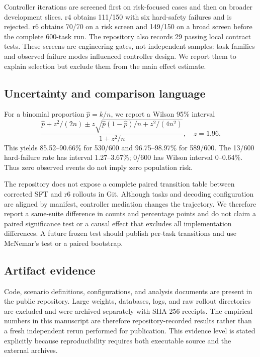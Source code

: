 \documentclass[11pt]{article}
\begin{document}
Controller iterations are screened first on risk-focused cases and then on broader development slices. r4 obtains 111/150 with six hard-safety failures and is rejected. r6 obtains 70/70 on a risk screen and 149/150 on a broad screen before the complete 600-task run. The repository also records 29 passing local contract tests. These screens are engineering gates, not independent samples: task families and observed failure modes influenced controller design. We report them to explain selection but exclude them from the main effect estimate.

\subsection{Uncertainty and comparison language}

For a binomial proportion $\hat p=k/n$, we report a Wilson 95\% interval
\begin{equation}
\frac{\hat p+z^2/(2n) \pm z\sqrt{\hat p(1-\hat p)/n+z^2/(4n^2)}}{1+z^2/n},
\quad z=1.96.
\label{eq:wilson}
\end{equation}
This yields 85.52--90.66\% for 530/600 and 96.75--98.97\% for 589/600. The 13/600 hard-failure rate has interval 1.27--3.67\%; 0/600 has Wilson interval 0--0.64\%. Thus zero observed events do not imply zero population risk.

The repository does not expose a complete paired transition table between corrected SFT and r6 rollouts in Git. Although tasks and decoding configuration are aligned by manifest, controller mediation changes the trajectory. We therefore report a same-suite difference in counts and percentage points and do not claim a paired significance test or a causal effect that excludes all implementation differences. A future frozen test should publish per-task transitions and use McNemar's test or a paired bootstrap.

\subsection{Artifact evidence}

Code, scenario definitions, configurations, and analysis documents are present in the public repository. Large weights, databases, logs, and raw rollout directories are excluded and were archived separately with SHA-256 receipts. The empirical numbers in this manuscript are therefore repository-recorded results rather than a fresh independent rerun performed for publication. This evidence level is stated explicitly because reproducibility requires both executable source and the external archives.
\end{document}
